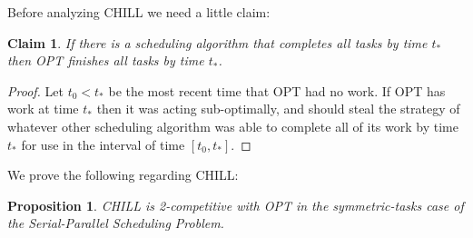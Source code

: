 \documentclass[twocolumn]{article}[11pt]
\newtheorem{proposition}{Proposition}
\newtheorem{clm}{Claim}
\begin{document}
Before analyzing CHILL we need a little claim: 
\begin{clm}
  \label{clm:optfinishesbeforeyou}
  If there is a scheduling algorithm that completes all tasks by
  time $t_*$ then OPT finishes all tasks by time $t_*$.
\end{clm}
\begin{proof}
  Let $t_0 < t_*$ be the most recent time that OPT had no work.
  If OPT has work at time $t_*$ then it was acting sub-optimally,
  and should steal the strategy of whatever other scheduling
  algorithm was able to complete all of its work by time $t_*$
  for use in the interval of time $[t_0, t_*]$.
\end{proof}

We prove the following regarding CHILL:
\begin{proposition}
  \label{prop:2competitive}
  CHILL is 2-competitive with OPT in the symmetric-tasks case of
  the Serial-Parallel Scheduling Problem. 
\end{proposition}
\end{document}

